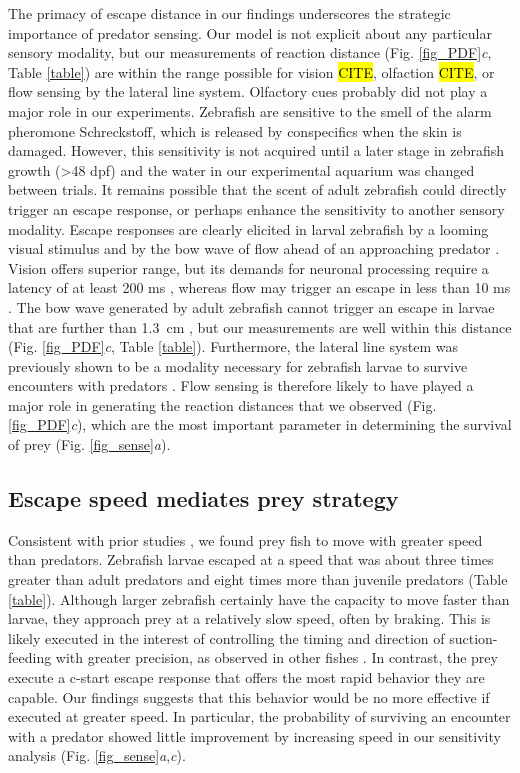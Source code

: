 \documentclass[]{rsos}%
\begin{document}
The primacy of escape distance in our findings underscores the strategic importance of predator sensing. 
Our model is not explicit about any particular sensory modality, but our measurements of reaction distance (Fig. \ref{fig_PDF}\textit{c}, Table \ref{table}) are within the range possible for vision \hl{CITE}, olfaction \hl{CITE}, or flow sensing by the lateral line system.
Olfactory cues probably did not play a major role in our experiments. 
Zebrafish are sensitive to the smell of the alarm pheromone Schreckstoff, which is released by conspecifics when the skin is damaged. 
However, this sensitivity is not acquired until a later stage in zebrafish growth (>48 dpf)\cite{Waldman:1982ic} and the water in our experimental aquarium was changed between trials.
It remains possible that the scent of adult zebrafish could directly trigger an escape response, or perhaps enhance the sensitivity to another sensory modality.
Escape responses are clearly elicited in larval zebrafish by a looming visual stimulus \cite{Temizer:2015ux} and by the bow wave of flow ahead of an approaching predator \cite{Stewart:2014cma}.
Vision offers superior range, but its demands for neuronal processing require a latency of at least 200 ms \cite{Burgess:2007vp}, whereas flow may trigger an escape in less than 10 ms \cite{Liu:1999fs}.
The bow wave generated by adult zebrafish cannot trigger an escape in larvae that are further than \SI{1.3}{\cm} \cite{Stewart:2014cma}, but our measurements are well within this distance (Fig. \ref{fig_PDF}\textit{c}, Table \ref{table}).
Furthermore, the lateral line system was previously shown to be a  modality necessary for zebrafish larvae to survive encounters with predators \cite{Stewart:2013bha}.
Flow sensing is therefore likely to have played a major role in generating the reaction distances that we observed (Fig. \ref{fig_PDF}\textit{c}), which are the most important parameter in determining the survival of prey (Fig. \ref{fig_sense}\textit{a}).

\subsection{Escape speed mediates prey strategy} 

Consistent with prior studies \cite{Stewart:2013bha,Soto:2015cj}, we found prey fish to move with greater speed than predators.
Zebrafish larvae escaped at a speed that was about three times greater than adult predators and eight times more than juvenile predators (Table \ref{table}).
Although larger zebrafish certainly have the capacity to move faster than larvae, they approach prey at a relatively slow speed, often by braking.
This is likely executed in the interest of controlling the timing and direction of suction-feeding with greater precision, as observed in other fishes \cite{Higham:2005iu,Higham:2007go}.
In contrast, the prey execute a c-start escape response that offers the most rapid behavior they are capable.
Our findings suggests that this behavior would be no more effective if executed at greater speed.
In particular, the probability of surviving an encounter with a predator showed little improvement by increasing speed in our sensitivity analysis (Fig. \ref{fig_sense}\textit{a},\textit{c}).
\end{document}
